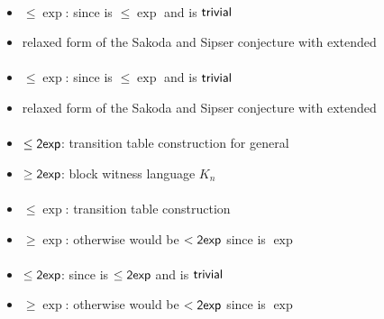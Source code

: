 \paragraph{\ONFA{}\tto\OMODLA}
\begin{itemize}
	\item $\le\exp$: since \hyperref[cost:1NFAto1DFA]{\ONFA{}\tto\ODFA} is $\le\exp$ and \ODFA{}\tto\OMODLA is $\mathsf{trivial}$
	\item relaxed form of the Sakoda and Sipser conjecture with extended \TDFA
\end{itemize}
\paragraph{\TNFA{}\tto\OMODLA}
\begin{itemize}
	\item $\le\exp$: since \hyperref[cost:2NFAto1DFA]{\TNFA{}\tto\ODFA} is $\le\exp$ and \ODFA{}\tto\OMODLA is $\mathsf{trivial}$
	\item relaxed form of the Sakoda and Sipser conjecture with extended \TDFA
\end{itemize}
\paragraph{\OMOLA{}\tto\ODFA}\label{cost:OM1LAto1DFA}
\begin{itemize}
	\item $\le\mathsf{2exp}$: transition table construction for general \OLA \cite{PigPis14}
	\item $\ge\mathsf{2exp}$: block witness language $K_n$ \cite{PigPri23a}
\end{itemize}
\paragraph{\OMOLA{}\tto\ONFA}\label{cost:OM1LAto1NFA}
\begin{itemize}
	\item $\le\exp$: transition table construction \cite{PigPis14}
	\item $\ge\exp$: otherwise \hyperref[cost:OM1LAto1DFA]{\OMOLA{}\tto\ODFA} would be $<\mathsf{2exp}$ since \hyperref[cost:1NFAto1DFA]{\ONFA{}\tto\ODFA} is $\exp$
\end{itemize}
\paragraph{\OMOLA{}\tto\TDFA}
\begin{itemize}
	\item $\le\mathsf{2exp}$: since \hyperref[cost:OM1LAto1DFA]{\OMOLA{}\tto\ODFA} is $\le\mathsf{2exp}$ and \ODFA{}\tto\TDFA is $\mathsf{trivial}$
	\item $\ge\exp$: otherwise \hyperref[cost:OM1LAto1DFA]{\OMOLA{}\tto\ODFA} would be $<\mathsf{2exp}$ since \hyperref[cost:2DFAto1DFA]{\TDFA{}\tto\ODFA} is $\exp$
\end{itemize}
